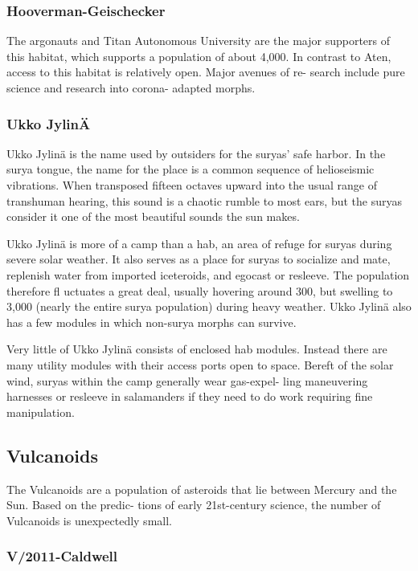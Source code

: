 \subsubsection{Hooverman-Geischecker}

The argonauts and Titan Autonomous University are 
the major supporters of this habitat, which supports a 
population of about 4,000. In contrast to Aten, access 
to this habitat is relatively open. Major avenues of re-
search include pure science and research into corona-
adapted morphs.

\subsubsection{Ukko JylinÄ}

Ukko Jylinä is the name used by outsiders for the 
suryas' safe harbor. In the surya tongue, the name 
for the place is a common sequence of helioseismic 
vibrations. When transposed fifteen octaves upward 
into the usual range of transhuman hearing, this 
sound is a chaotic rumble to most ears, but the 
suryas consider it one of the most beautiful sounds 
the sun makes.

Ukko Jylinä is more of a camp than a hab, an area 
of refuge for suryas during severe solar weather. It 
also serves as a place for suryas to socialize and mate, 
replenish water from imported iceteroids, and egocast 
or resleeve. The population therefore fl uctuates  a 
great deal, usually hovering around 300, but swelling 
to 3,000 (nearly the entire surya population) during 
heavy weather. Ukko Jylinä also has a few modules in 
which non-surya morphs can survive.

Very little of Ukko Jylinä consists of enclosed hab 
modules. Instead there are many utility modules with 
their access ports open to space. Bereft of the solar 
wind, suryas within the camp generally wear gas-expel-
ling maneuvering harnesses or resleeve in salamanders 
if they need to do work requiring fine manipulation.

\subsection{Vulcanoids}

The Vulcanoids are a population of asteroids that lie 
between Mercury and the Sun. Based on the predic-
tions of early 21st-century science, the number of 
Vulcanoids is unexpectedly small.

\subsubsection{V/2011-Caldwell}

